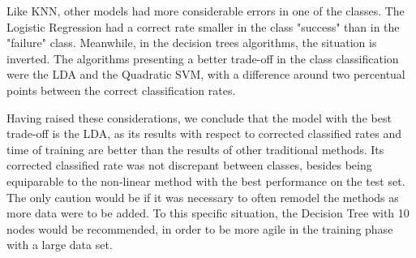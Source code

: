 \documentclass[conference]{IEEEtran}
\begin{document}
Like KNN, other models had more considerable errors in one of the classes. The Logistic
Regression had a correct rate smaller in the class "success" than in the "failure" class.
Meanwhile, in the decision trees algorithms, the situation is inverted.  The algorithms 
presenting a better trade-off in the class classification were the LDA and the 
Quadratic SVM, with a difference around two percentual points between the correct 
classification rates.

Having raised these considerations, we conclude that the model with the best
trade-off is the LDA, as its results with respect to corrected classified rates and 
time of training are better than the results of other traditional methods. Its 
corrected classified rate was not discrepant between classes, besides being equiparable 
to the non-linear method with the best performance on the test set. The only caution would 
be if it was necessary to often remodel the methods as more data were to be added.
To this specific situation, the Decision Tree with 10 nodes would be recommended, in order to be 
more agile in the training phase with a large data set. 



\end{document}
